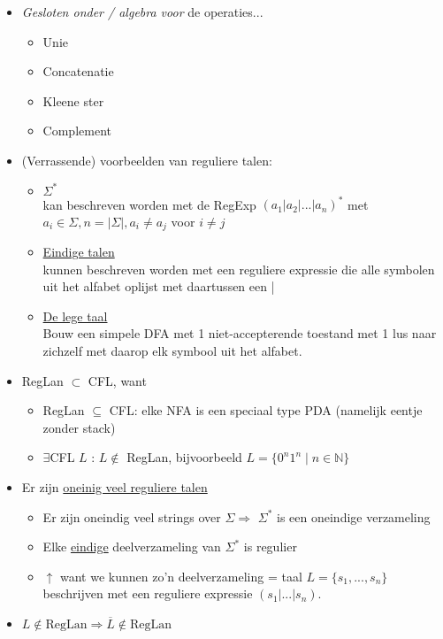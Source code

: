 \documentclass[kulak]{kulakarticle}
\newcommand{\N}{\mathbb{N}}
\newcommand{\abs}[1]{\lvert #1 \rvert}
\theoremstyle{definition}
\begin{document}
	\begin{itemize}
		\item \textit{Gesloten onder / algebra voor} de operaties... \begin{itemize}
			\item Unie
			\item Concatenatie
			\item Kleene ster
			\item Complement
		\end{itemize}
		\item (Verrassende) voorbeelden van reguliere talen:
		\begin{itemize}
			\item \underline{\(\Sigma^*\)}\\
			kan beschreven worden met de RegExp \((a_1|a_2|...|a_n)^*\) met \(a_i\in \Sigma, n=\abs{\Sigma}, a_i\neq a_j\) voor \(i\neq j\)
			\item \underline{Eindige talen}\\
			kunnen beschreven worden met een reguliere expressie die alle symbolen uit het alfabet oplijst met daartussen een |
			\item \underline{De lege taal}\\
			Bouw een simpele DFA met 1 niet-accepterende toestand met 1 lus naar zichzelf met daarop elk symbool uit het alfabet.
		\end{itemize}
		\item RegLan \(\subset\) CFL, want
		\begin{itemize}
			\item RegLan \(\subseteq\) CFL: elke NFA is een speciaal type PDA (namelijk eentje zonder stack)
			\item \(\exists\)CFL \(L\) : \(L \notin \) RegLan, bijvoorbeeld \(L=\{0^n1^n \mid n\in\N\}\)
		\end{itemize}
		\item Er zijn \underline{oneinig veel reguliere talen} \begin{itemize}
			\item Er zijn oneindig veel strings over \(\Sigma \Rightarrow\) \(\Sigma^*\) is een oneindige verzameling
			\item Elke \underline{eindige} deelverzameling van \(\Sigma^*\) is regulier
			\item \(\uparrow\) want we kunnen zo'n deelverzameling = taal \(L=\{s_1,...,s_n\}\) beschrijven met een reguliere expressie \((s_1|...|s_n)\).
		\end{itemize}
		\item \(L \notin \text{RegLan} \Rightarrow \overline{L} \notin \text{RegLan} \)
	\end{itemize}
\end{document}
